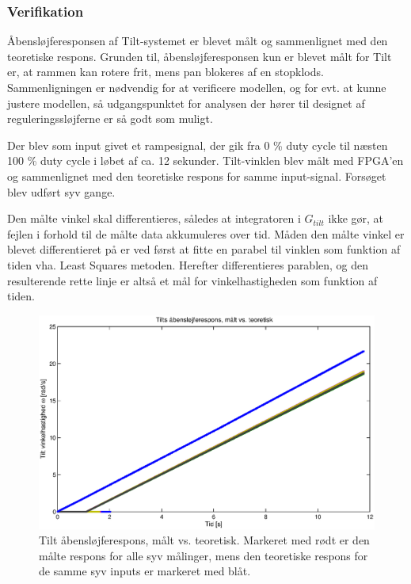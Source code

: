 \subsubsection{Verifikation}
\label{subsec:verifikation}
Åbensløjferesponsen af Tilt-systemet er blevet målt og sammenlignet med den teoretiske respons.
Grunden til, åbensløjferesponsen kun er blevet målt for Tilt er, at rammen kan rotere frit,
mens pan blokeres af en stopklods.
Sammenligningen er nødvendig for at verificere modellen, og for evt. at kunne justere modellen,
så udgangspunktet for analysen der hører til designet af reguleringssløjferne er så godt som muligt.

Der blev som input givet et rampesignal, der gik fra 0 \% duty cycle til næsten 100 \% duty cycle
i løbet af ca. 12 sekunder. Tilt-vinklen blev målt med FPGA'en og sammenlignet med den teoretiske
respons for samme input-signal.
Forsøget blev udført syv gange.

Den målte vinkel skal differentieres, således at integratoren i \(G_{tilt}\) ikke gør,
at fejlen i forhold til de målte data akkumuleres over tid.
Måden den målte vinkel er blevet differentieret på er ved først at fitte en parabel
til vinklen som funktion af tiden vha. Least Squares metoden. Herefter differentieres
parablen, og den resulterende rette linje er altså et mål for vinkelhastigheden som funktion af tiden.

\begin{figure}[th!]
	\centering
	\includegraphics[width=1\textwidth]{./graphics/openloopVelocity1.eps}
	\caption[Tilt åbensløjferespons, målt vs. teoretisk]
		{Tilt åbensløjferespons, målt vs. teoretisk.
		Markeret med rødt er den målte respons for alle syv målinger,
		mens den teoretiske respons for de samme syv inputs er markeret med blåt.}
	\label{fig:openloopV1}
\end{figure}

